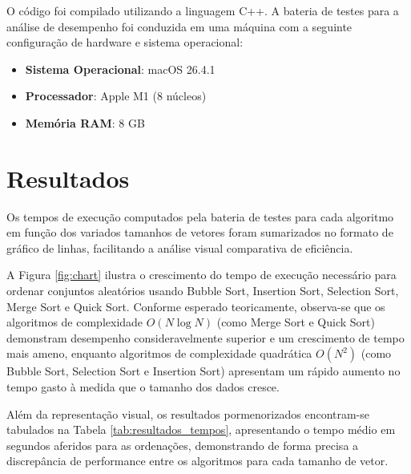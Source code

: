 \documentclass[
	article,			%
	11pt,				%
	oneside,			%
	a4paper,			%
	english,			%
	brazil,				%
	sumario=tradicional
	]{abntex2}
\begin{document}
O código foi compilado utilizando a linguagem C++. A bateria de testes para a análise de desempenho foi conduzida em uma máquina com a seguinte configuração de hardware e sistema operacional:
\begin{itemize}
    \item \textbf{Sistema Operacional}: macOS 26.4.1
    \item \textbf{Processador}: Apple M1 (8 núcleos)
    \item \textbf{Memória RAM}: 8 GB
\end{itemize}

\section{Resultados}

Os tempos de execução computados pela bateria de testes para cada algoritmo em função dos variados tamanhos de vetores foram sumarizados no formato de gráfico de linhas, facilitando a análise visual comparativa de eficiência. 

A Figura \ref{fig:chart} ilustra o crescimento do tempo de execução necessário para ordenar conjuntos aleatórios usando Bubble Sort, Insertion Sort, Selection Sort, Merge Sort e Quick Sort. Conforme esperado teoricamente, observa-se que os algoritmos de complexidade $O(N \log N)$ (como Merge Sort e Quick Sort) demonstram desempenho consideravelmente superior e um crescimento de tempo mais ameno, enquanto algoritmos de complexidade quadrática $O(N^2)$ (como Bubble Sort, Selection Sort e Insertion Sort) apresentam um rápido aumento no tempo gasto à medida que o tamanho dos dados cresce.

Além da representação visual, os resultados pormenorizados encontram-se tabulados na Tabela \ref{tab:resultados_tempos}, apresentando o tempo médio em segundos aferidos para as ordenações, demonstrando de forma precisa a discrepância de performance entre os algoritmos para cada tamanho de vetor.
\end{document}
